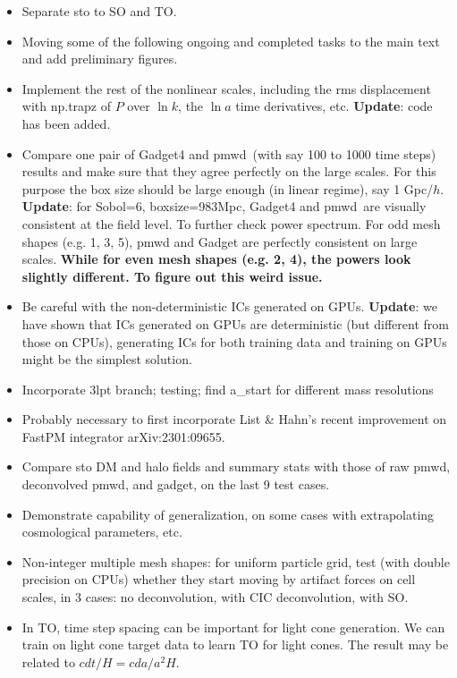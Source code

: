 \documentclass[usenatbib]{mnras}
\newcommand{\pmwd}{{\usefont{T1}{nova}{m}{sl}pmwd}}
\renewcommand{\d}{d}
\begin{document}
\begin{itemize}
\item Separate sto to SO and TO.
\item Moving some of the following ongoing and completed tasks to the
    main text and add preliminary figures.
\item Implement the rest of the nonlinear scales, including the rms
    displacement with np.trapz of $P$ over $\ln k$, the $\ln a$ time
    derivatives, etc.\newline
    \textbf{Update}: code has been added.
\item Compare one pair of Gadget4 and \pmwd\ (with say 100 to 1000 time
    steps) results and make sure that they agree perfectly on the large
    scales. For this purpose the box size should be large enough (in
    linear regime), say 1 Gpc/$h$.\newline
    \textbf{Update}: for Sobol=6, boxsize=983Mpc, Gadget4 and \pmwd\ are visually
    consistent at the field level. To further check power spectrum. For odd mesh
    shapes (e.g. 1, 3, 5), pmwd and Gadget are perfectly consistent on large
    scales. \textbf{While for even mesh shapes (e.g. 2, 4), the powers look
    slightly different. To figure out this weird issue.}
\item Be careful with the non-deterministic ICs generated on GPUs.\newline
      \textbf{Update}: we have shown that ICs generated on GPUs are
      deterministic (but different from those on CPUs), generating ICs for both
      training data and training on GPUs might be the simplest solution.
\item Incorporate 3lpt branch; testing; find a\_start for different mass
  resolutions
\item Probably necessary to first incorporate List \& Hahn's recent
  improvement on FastPM integrator arXiv:2301:09655.
\item Compare sto DM and halo fields and summary stats with those of raw
  pmwd, deconvolved pmwd, and gadget, on the last 9 test cases.
\item Demonstrate capability of generalization, on some cases with
  extrapolating cosmological parameters, etc.
\item Non-integer multiple mesh shapes: for uniform particle grid, test
  (with double precision on CPUs) whether they start moving by artifact
  forces on cell scales, in 3 cases: no deconvolution, with CIC
  deconvolution, with SO.
\item In TO, time step spacing can be important for light cone
  generation. We can train on light cone target data to learn TO for
  light cones. The result may be related to $c \d t/H = c \d a / a^2 H$.
\end{itemize}
\end{document}
